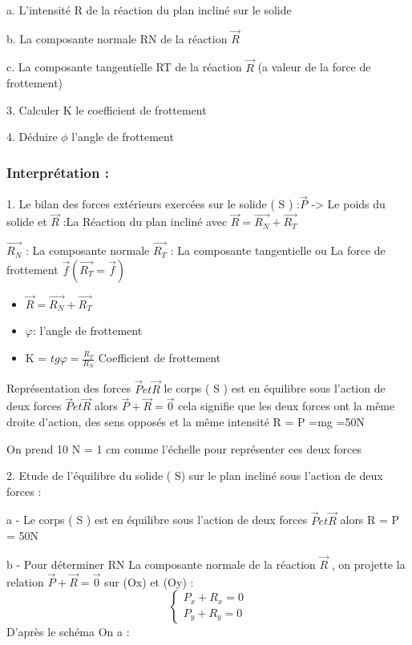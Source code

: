 \documentclass[12pt]{article}
\begin{document}
  a. L’intensité R de la réaction du plan incliné sur le solide
 
  b. La composante normale RN de la réaction $\vec{R}$

  c. La composante tangentielle RT de la réaction $\vec{R}$ (a valeur de la
force de frottement)

3. Calculer K le coefficient de frottement

4. Déduire $\phi$ l’angle de frottement


\subsubsection{Interprétation :}

1. Le bilan des forces extérieurs exercées sur le solide ( S ) :$ \vec{P}$ -> Le poids du solide et $\vec{R}$ :La Réaction du plan incliné avec   $\vec{R} = \vec{R_N} + \vec{R_T}$

$\vec{R_N}$ : La composante normale
$\vec{R_T} $ : La composante tangentielle ou La force de
frottement  $\vec{f} (\vec{R_T} =\vec{f}) $

\begin{itemize}
    \item  $\vec{R} = \vec{R_N} + \vec{R_T}$
    \item  $\varphi$: l’angle de frottement
    \item K = $tg\varphi = \frac{R_T}{R_N}$ Coefficient de frottement 
\end{itemize}
Représentation des forces $\vec{{P}} et\vec{R}$ 
le corps ( S ) est en équilibre sous l’action de deux forces $\vec{{P}} et\vec{R}$ alors $\vec{P} + \vec{R} = \vec{0}$
cela signifie
que les deux forces ont la même droite d’action, des sens opposés et la même intensité
R = P =mg =50N

On prend 10 N =  1 cm comme l’échelle pour représenter ces deux forces 

2. Etude de l’équilibre du solide ( S) sur le plan incliné sous l’action de deux forces :
 
 a - Le corps ( S ) est en équilibre sous l’action de deux forces $\vec{{P}} et\vec{R}$ alors R = P = 50N

 b - Pour déterminer RN La composante normale de la réaction $\vec{R}$ , on projette la relation $\vec{P} + \vec{R} = \vec{0}$ sur (Ox) et (Oy) : 
$$\begin{cases}
  P_x + R_x = 0\\
  P_y + R_y = 0
\end{cases}
$$
D’après le schéma On a : 
\end{document}
